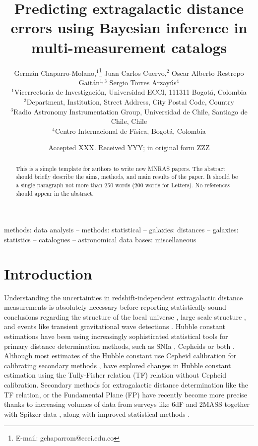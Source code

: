 \documentclass[a4paper,fleqn,usenatbib]{mnras}
\title[Predicting extragalactic distance errors]{Predicting extragalactic distance errors using Bayesian inference in multi-measurement catalogs}
\author[G. Chaparro-Molano et al.]{Germ\'an Chaparro-Molano,$^{1}$\thanks{E-mail: gchaparrom@ecci.edu.co}
Juan Carlos Cuervo,$^{2}$
Oscar Alberto Restrepo Gait\'an$^{1,3}$ \newauthor
Sergio Torres Arzay\'{u}s$^{4}$
\\
$^{1}$Vicerrector\'ia de Investigaci\'on, Universidad ECCI, 111311 Bogot\'a, Colombia\\
$^{2}$Department, Institution, Street Address, City Postal Code, Country\\
$^{3}$Radio Astronomy Instrumentation Group, Universidad de Chile, Santiago de Chile, Chile\\
$^{4}$Centro Internacional de F\'isica, Bogot\'a, Colombia
}
\date{Accepted XXX. Received YYY; in original form ZZZ}
\begin{document}
\label{firstpage}
\pagerange{\pageref{firstpage}--\pageref{lastpage}}
\maketitle

\begin{abstract}
This is a simple template for authors to write new MNRAS papers.
The abstract should briefly describe the aims, methods, and main results of the paper.
It should be a single paragraph not more than 250 words (200 words for Letters).
No references should appear in the abstract.
\end{abstract}

\begin{keywords}
methods: data analysis -- methods: statistical -- galaxies: distances -- galaxies: statistics -- catalogues -- astronomical data bases: miscellaneous
\end{keywords}



\section{Introduction}


Understanding the uncertainties in redshift-independent extragalactic distance measurements is absolutely necessary before reporting statistically sound conclusions regarding the structure of the local universe \citep{void,locunivcf,nongauss,6df,localunipv,said,gg3500}, large scale structure \citep{anishub,gallargescale,morphanis,tecciencia,bayesh}, and events like transient gravitational wave detections \citep{gwgallist}. Hubble constant estimations have been using increasingly sophisticated statistical tools for primary distance determination methods, such as SNIa \citep{ridsn,unity,hubsn2018}, Cepheids \citet{hubngc} or both \citep{riess}. Although most estimates of the Hubble constant use Cepheid calibration for calibrating secondary methods \citep{hubunc,huborig,hub2010}, \citet{noceph} have explored changes in Hubble constant estimation using the Tully-Fisher relation (TF) relation without Cepheid calibration. Secondary methods for extragalactic distance determination like the TF relation, or the Fundamental Plane (FP) have recently become more precise thanks to increasing volumes of data from surveys like 6dF \citep{6df}  and  2MASS \citep{2mass,tf07dist} together with Spitzer data \citep{sorce}, along with improved statistical methods \citep{precisetf}. \\
\end{document}
